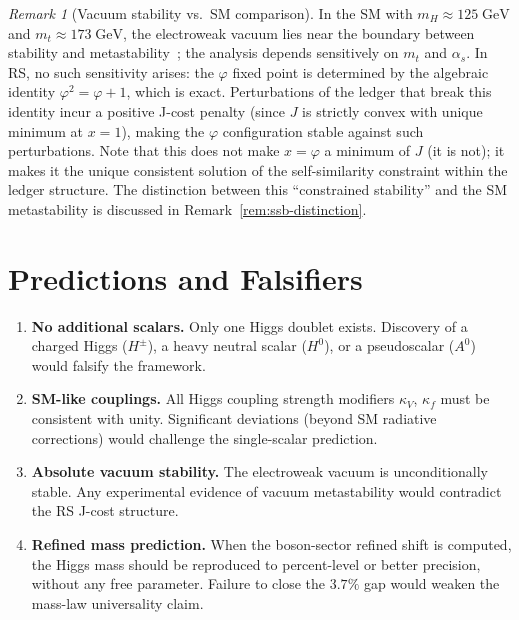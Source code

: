 \documentclass[12pt,a4paper]{article}
\theoremstyle{definition}
\theoremstyle{remark}
\newtheorem{remark}[theorem]{Remark}
\begin{document}
\begin{remark}[Vacuum stability vs.\ SM comparison]
\label{rem:stability}
In the SM with $m_H \approx 125\;\mathrm{GeV}$ and
$m_t \approx 173\;\mathrm{GeV}$, the electroweak vacuum
lies near the boundary between stability and
metastability~\cite{Degrassi}; the analysis depends sensitively
on $m_t$ and $\alpha_s$.
In RS, no such sensitivity arises: the $\varphi$ fixed point is
determined by the algebraic identity $\varphi^2 = \varphi + 1$,
which is exact.  Perturbations of the ledger that break this
identity incur a positive J-cost penalty (since $J$ is strictly
convex with unique minimum at $x = 1$), making the $\varphi$
configuration stable against such perturbations.  Note that
this does not make $x = \varphi$ a minimum of $J$ (it is not);
it makes it the unique consistent solution of the self-similarity
constraint within the ledger structure.  The distinction between
this ``constrained stability'' and the SM metastability is
discussed in Remark~\ref{rem:ssb-distinction}.
\end{remark}

\section{Predictions and Falsifiers}
\label{sec:predictions}

\begin{enumerate}
  \item \textbf{No additional scalars.}
  Only one Higgs doublet exists.  Discovery of a charged
  Higgs ($H^\pm$), a heavy neutral scalar ($H^0$), or a
  pseudoscalar ($A^0$) would falsify the framework.

  \item \textbf{SM-like couplings.}
  All Higgs coupling strength modifiers $\kappa_V$, $\kappa_f$
  must be consistent with unity.  Significant deviations
  (beyond SM radiative corrections) would challenge the
  single-scalar prediction.

  \item \textbf{Absolute vacuum stability.}
  The electroweak vacuum is unconditionally stable.  Any
  experimental evidence of vacuum metastability would
  contradict the RS J-cost structure.

  \item \textbf{Refined mass prediction.}
  When the boson-sector refined shift is computed, the
  Higgs mass should be reproduced to percent-level or
  better precision, without any free parameter.  Failure
  to close the $3.7\%$ gap would weaken the mass-law
  universality claim.
\end{enumerate}
\end{document}
